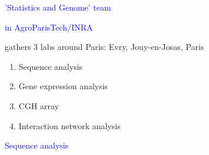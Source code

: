 \documentclass[dvips, lscape]{foils}
\newcommand{\textblue}[1]{\textcolor{blue}{#1}}
\newcommand{\chapter}[1]{\centerline{\LARGE \textblue{#1}}}
\newcommand{\section}[1]{\centerline{\Large \textblue{#1}}}
\newcommand{\subsection}[1]{\noindent{\large \textblue{#1}}}
\begin{document}
\landscape
\headrulewidth 0pt 
\pagestyle{empty} 
\cfoot{}
\rfoot{}
\setcounter{page}{0}


\chapter{'Statistics and Genome' team} 
\bigskip
\chapter{in AgroParisTech/INRA} 

\subsection{'SSB'group} gathers 3 labs around Paris: Evry,
Jouy-en-Josas, Paris 

\subsection{In Paris:}
\begin{enumerate}
\item Sequence analysis
\item Gene expression analysis
\item CGH array
\item Interaction network analysis
\end{enumerate}

\newpage
\section{Sequence analysis}
\end{document}
